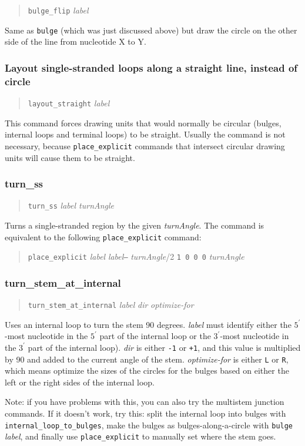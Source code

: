 \documentclass[letterpaper,12pt]{report}
\newcommand{\example}[1]{
\begin{quote}
{\raggedright
#1
}
\end{quote}
}
\begin{document}
\example{{\tt bulge\_flip}\textit{ label }}

Same as {\tt bulge} (which was just discussed above) but draw the circle on
the other side of the line from nucleotide X to Y.

\subsubsection{Layout single-stranded loops along a straight line,
instead of circle}
\example{
{\tt layout\_straight} \textit{label}
}

This command forces drawing units that would normally be circular (bulges, internal loops and terminal loops) to be straight.  Usually the command is not necessary, because {\tt place\_explicit} commands that intersect circular drawing units will cause them to be straight.

\subsubsection[turn\_ss]{turn\_ss}
\example{
{\tt turn\_ss} \textit{label  turnAngle}
}

Turns a single-stranded region by the given \textit{turnAngle}.
The command is equivalent to the following {\tt place\_explicit} command:

\example{{\tt place\_explicit} {\it label} {\it label}{\tt --} {\it turnAngle}/2 {\tt 1 0 0 0} {\it turnAngle}}

\subsubsection{turn\_stem\_at\_internal}
\label{sec:turnsteminternal}
\example{
{\tt turn\_stem\_at\_internal}  \textit{label } \textit{dir} 
\textit{optimize-for}
}

Uses an internal loop to turn the stem 90 degrees.  \textit{label }must
identify either the $5^\prime$-most nucleotide in the $5^\prime$ part of the
internal loop or the $3^\prime$-most nucleotide in the $3^\prime$ part of the internal loop).  
\textit{dir }is either {\tt {}-1} or {\tt +1}, and this value is
multiplied by 90 and added to the current angle of the stem. 
\textit{optimize-for }is either {\tt L} or {\tt R}, which means optimize the sizes
of the circles for the bulges based on either the left or the right
sides of the internal loop.

Note: if you have problems with this, you can also try
the multistem junction commands. If it doesn{\textquoteright}t work,
try this: split the internal loop into bulges with
{\tt internal\_loop\_to\_bulges}, make the bulges as bulges-along-a-circle
with {\tt bulge}\textit{ label}, and finally use {\tt place\_explicit} to manually
set where the stem goes.
\end{document}
